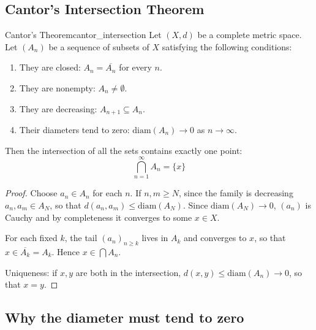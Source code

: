 \documentclass[11pt, a4paper]{article}
\begin{document}
\subsection{Cantor's Intersection Theorem}

\begin{teorema}{Cantor's Theorem}{cantor_intersection}
Let $(X, d)$ be a complete metric space. Let $(A_n)$ be a sequence of subsets of $X$ satisfying
the following conditions:
\begin{enumerate}
    \item They are closed: $A_n = \overline{A_n}$ for every $n$.
    \item They are nonempty: $A_n \neq \emptyset$.
    \item They are decreasing: $A_{n+1} \subseteq A_n$.
    \item Their diameters tend to zero: $\text{diam}(A_n) \to 0$ as $n \to \infty$.
\end{enumerate}
Then the intersection of all the sets contains exactly one point:
$$ \bigcap_{n=1}^{\infty} A_n = \{x\} $$
\end{teorema}

\begin{proof}
Choose $a_n \in A_n$ for each $n$. If $n, m \ge N$, since the family is decreasing
$a_n, a_m \in A_N$, so that $d(a_n, a_m) \le \mathrm{diam}(A_N)$. Since $\mathrm{diam}(A_N) \to 0$,
$(a_n)$ is Cauchy and by completeness it converges to some $x \in X$.

For each fixed $k$, the tail $(a_n)_{n \ge k}$ lives in $A_k$ and converges to $x$, so that
$x \in \overline{A_k} = A_k$. Hence $x \in \bigcap A_n$.

Uniqueness: if $x, y$ are both in the intersection, $d(x, y) \le \mathrm{diam}(A_n) \to 0$,
so that $x = y$.
\end{proof}

\subsection{Why the diameter must tend to zero}
\end{document}
